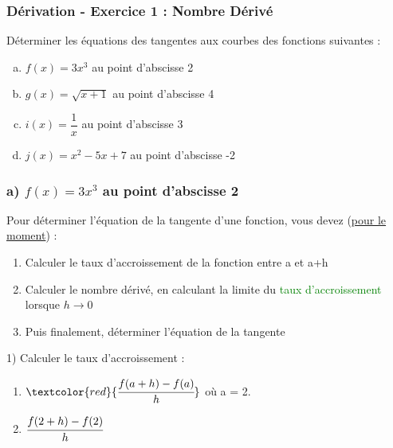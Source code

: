 \documentclass[t]{beamer}
\begin{document}
	\begin{frame}[label=pagebanale]
		\frametitle{Dérivation - Exercice 1 : Nombre Dérivé}
		\pause
		Déterminer les équations des tangentes aux courbes des fonctions suivantes :
		\pause
		\begin{enumerate}[a)]
			\item<+-> $f(x) = 3x^3$ au point d'abscisse 2
			\item<+-> $g(x) = \sqrt{x+1}$ au point d'abscisse 4
			\item<+-> $i(x) = \dfrac{1}{x}$ au point d'abscisse 3
			\item<+-> $j(x) = x^2 - 5x +7$ au point d'abscisse -2
		\end{enumerate}
	\end{frame}

	\begin{frame}
		\frametitle{a) $f(x) = 3x^3$ au point d'abscisse 2}
		\pause
		\begin{block}{}
			Pour déterminer l'équation de la tangente d'une fonction, vous devez (\underline{pour le moment}) :
			\pause
			\begin{enumerate}[1.]
				\item Calculer le taux d'accroissement de la fonction entre a et a+h
				\pause
				\item Calculer le nombre dérivé, \pause en calculant la limite du \textcolor{green}{taux d'accroissement} lorsque $h \rightarrow 0$
				\pause
				\item Puis finalement, déterminer l'équation de la tangente
			\end{enumerate}
		\end{block}
		\pause
		\begin{block}{1) Calculer le taux d'accroissement :}
			\pause
			\begin{enumerate}[]
				\item<+-> $\textcolor{red}{\cfrac{f(a+h)-f(a)}{h}}$ où a = 2.
				\item<+-> \(\cfrac{f(2+h)-f(2)}{h} \)
			\end{enumerate}
		\end{block}
	\end{frame}
\end{document}
